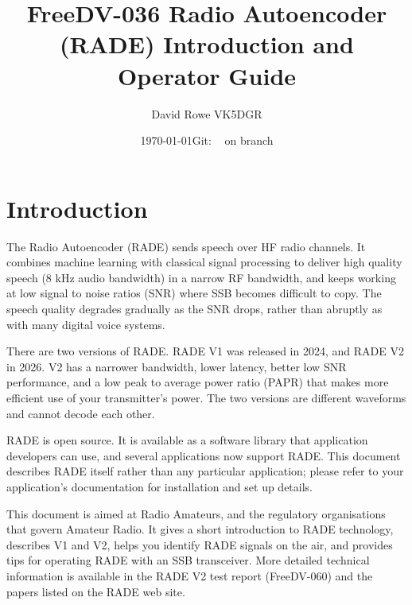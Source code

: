 \documentclass{article}
\newcommand{\commit}{\dots~(in \emph{packed-refs})}}
\newcommand{\gitrevision}{%
  \StrLeft{\commit}{7}%
}
\begin{document}


\title{FreeDV-036 Radio Autoencoder (RADE) Introduction and Operator Guide}
\author{David Rowe VK5DGR}
\date{\today \quad Git: \texttt{\gitrevision} on branch \texttt{\branch}\\}
\maketitle

\section{Introduction}

The Radio Autoencoder (RADE) sends speech over HF radio channels.  It combines machine learning with classical signal processing to deliver high quality speech (8 \si{kHz} audio bandwidth) in a narrow RF bandwidth, and keeps working at low signal to noise ratios (SNR) where SSB becomes difficult to copy.  The speech quality degrades gradually as the SNR drops, rather than abruptly as with many digital voice systems.

There are two versions of RADE.  RADE V1 was released in 2024, and RADE V2 in 2026.  V2 has a narrower bandwidth, lower latency, better low SNR performance, and a low peak to average power ratio (PAPR) that makes more efficient use of your transmitter's power.  The two versions are different waveforms and cannot decode each other.

RADE is open source.  It is available as a software library that application developers can use, and several applications now support RADE.  This document describes RADE itself rather than any particular application; please refer to your application's documentation for installation and set up details.

This document is aimed at Radio Amateurs, and the regulatory organisations that govern Amateur Radio.  It gives a short introduction to RADE technology, describes V1 and V2, helps you identify RADE signals on the air, and provides tips for operating RADE with an SSB transceiver.  More detailed technical information is available in the RADE V2 test report (FreeDV-060) and the papers listed on the RADE web site.
\end{document}
